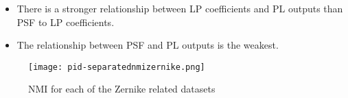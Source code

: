 		\begin{itemize}
			\item There is a stronger relationship between LP coefficients and PL outputs than PSF to LP coefficients.
			\item The relationship between PSF and PL outputs is the weakest.
			
		\end{itemize}
		
		\begin{figure*}[ht!]
			\centering
			\texttt{[image: pid-separatednmizernike.png]}
			\caption{NMI for each of the Zernike related datasets}
		\end{figure*}